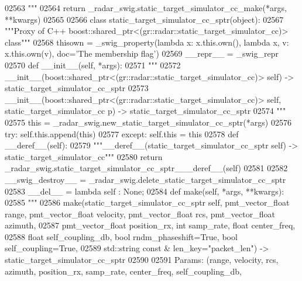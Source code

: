 \begin{DoxyCode}
{{{{{{{{{{02563 \textcolor{stringliteral}{    """}
02564   \textcolor{keywordflow}{return} \_radar\_swig.static\_target\_simulator\_cc\_make(*args, **kwargs)
02565 
02566 \textcolor{keyword}{class }static_target_simulator_cc_sptr(object):
02567     \textcolor{stringliteral}{"""Proxy of C++ boost::shared\_ptr<(gr::radar::static\_target\_simulator\_cc)> class"""}
02568     thisown = _swig_property(\textcolor{keyword}{lambda} x: x.this.own(), \textcolor{keyword}{lambda} x, v: x.this.own(v), doc=\textcolor{stringliteral}{'The membership flag'})
02569     \_\_repr\_\_ = \_swig\_repr
02570     \textcolor{keyword}{def }__init__(self, *args): 
02571         \textcolor{stringliteral}{"""}
02572 \textcolor{stringliteral}{        \_\_init\_\_(boost::shared\_ptr<(gr::radar::static\_target\_simulator\_cc)> self) ->
       static\_target\_simulator\_cc\_sptr}
02573 \textcolor{stringliteral}{        \_\_init\_\_(boost::shared\_ptr<(gr::radar::static\_target\_simulator\_cc)> self,
       static\_target\_simulator\_cc p) -> static\_target\_simulator\_cc\_sptr}
02574 \textcolor{stringliteral}{        """}
02575         this = \_radar\_swig.new\_static\_target\_simulator\_cc\_sptr(*args)
02576         \textcolor{keywordflow}{try}: self.this.append(this)
02577         \textcolor{keywordflow}{except}: self.this = this
02578     \textcolor{keyword}{def }__deref__(self):
02579         \textcolor{stringliteral}{"""\_\_deref\_\_(static\_target\_simulator\_cc\_sptr self) -> static\_target\_simulator\_cc"""}
02580         \textcolor{keywordflow}{return} \_radar\_swig.static\_target\_simulator\_cc\_sptr\_\_\_deref\_\_(self)
02581 
02582     \_\_swig\_destroy\_\_ = \_radar\_swig.delete\_static\_target\_simulator\_cc\_sptr
02583     \_\_del\_\_ = \textcolor{keyword}{lambda} self : \textcolor{keywordtype}{None};
02584     \textcolor{keyword}{def }make(self, *args, **kwargs):
02585         \textcolor{stringliteral}{"""}
02586 \textcolor{stringliteral}{        make(static\_target\_simulator\_cc\_sptr self, pmt\_vector\_float range, pmt\_vector\_float velocity,
       pmt\_vector\_float rcs, pmt\_vector\_float azimuth, }
02587 \textcolor{stringliteral}{            pmt\_vector\_float position\_rx, int samp\_rate, float center\_freq, }
02588 \textcolor{stringliteral}{            float self\_coupling\_db, bool rndm\_phaseshift=True, bool self\_coupling=True, }
02589 \textcolor{stringliteral}{            std::string const & len\_key="packet\_len") -> static\_target\_simulator\_cc\_sptr}
02590 \textcolor{stringliteral}{}
02591 \textcolor{stringliteral}{        Params: (range, velocity, rcs, azimuth, position\_rx, samp\_rate, center\_freq, self\_coupling\_db,
}}}}}}}}}}}
\end{DoxyCode}
